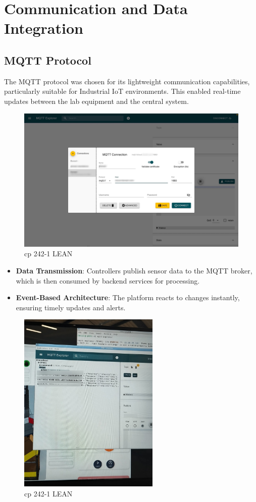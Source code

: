 
\section{Communication and Data Integration}

\subsection{MQTT Protocol}
The MQTT protocol was chosen for its lightweight communication capabilities, particularly suitable for Industrial IoT environments. This enabled real-time updates between the lab equipment and the central system.
\begin{figure}[H]
    \centering
    \includegraphics[width=1\textwidth]{chapters/3/img/15.jpg}
    \caption{cp 242-1 LEAN}
    \label{fig:campus}
\end{figure}
\begin{itemize}
    \item \textbf{Data Transmission}: Controllers publish sensor data to the MQTT broker, which is then consumed by backend services for processing.
    \item \textbf{Event-Based Architecture}: The platform reacts to changes instantly, ensuring timely updates and alerts.
\end{itemize}
\begin{figure}[H]
    \centering
    \includegraphics[width=0.6\textwidth]{chapters/3/img/14.jpg}
    \caption{cp 242-1 LEAN}
    \label{fig:campus}
\end{figure}


